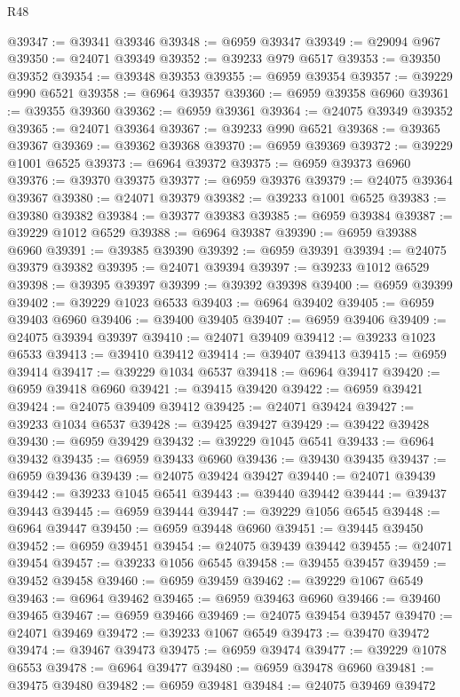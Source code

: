 \begin{lexlean}{R48}
\begin{coremodule}
@39347 := @39341 @39346
@39348 := @6959 @39347
@39349 := @29094 @967
@39350 := @24071 @39349
@39352 := @39233 @979 @6517
@39353 := @39350 @39352
@39354 := @39348 @39353
@39355 := @6959 @39354
@39357 := @39229 @990 @6521
@39358 := @6964 @39357
@39360 := @6959 @39358 @6960
@39361 := @39355 @39360
@39362 := @6959 @39361
@39364 := @24075 @39349 @39352
@39365 := @24071 @39364
@39367 := @39233 @990 @6521
@39368 := @39365 @39367
@39369 := @39362 @39368
@39370 := @6959 @39369
@39372 := @39229 @1001 @6525
@39373 := @6964 @39372
@39375 := @6959 @39373 @6960
@39376 := @39370 @39375
@39377 := @6959 @39376
@39379 := @24075 @39364 @39367
@39380 := @24071 @39379
@39382 := @39233 @1001 @6525
@39383 := @39380 @39382
@39384 := @39377 @39383
@39385 := @6959 @39384
@39387 := @39229 @1012 @6529
@39388 := @6964 @39387
@39390 := @6959 @39388 @6960
@39391 := @39385 @39390
@39392 := @6959 @39391
@39394 := @24075 @39379 @39382
@39395 := @24071 @39394
@39397 := @39233 @1012 @6529
@39398 := @39395 @39397
@39399 := @39392 @39398
@39400 := @6959 @39399
@39402 := @39229 @1023 @6533
@39403 := @6964 @39402
@39405 := @6959 @39403 @6960
@39406 := @39400 @39405
@39407 := @6959 @39406
@39409 := @24075 @39394 @39397
@39410 := @24071 @39409
@39412 := @39233 @1023 @6533
@39413 := @39410 @39412
@39414 := @39407 @39413
@39415 := @6959 @39414
@39417 := @39229 @1034 @6537
@39418 := @6964 @39417
@39420 := @6959 @39418 @6960
@39421 := @39415 @39420
@39422 := @6959 @39421
@39424 := @24075 @39409 @39412
@39425 := @24071 @39424
@39427 := @39233 @1034 @6537
@39428 := @39425 @39427
@39429 := @39422 @39428
@39430 := @6959 @39429
@39432 := @39229 @1045 @6541
@39433 := @6964 @39432
@39435 := @6959 @39433 @6960
@39436 := @39430 @39435
@39437 := @6959 @39436
@39439 := @24075 @39424 @39427
@39440 := @24071 @39439
@39442 := @39233 @1045 @6541
@39443 := @39440 @39442
@39444 := @39437 @39443
@39445 := @6959 @39444
@39447 := @39229 @1056 @6545
@39448 := @6964 @39447
@39450 := @6959 @39448 @6960
@39451 := @39445 @39450
@39452 := @6959 @39451
@39454 := @24075 @39439 @39442
@39455 := @24071 @39454
@39457 := @39233 @1056 @6545
@39458 := @39455 @39457
@39459 := @39452 @39458
@39460 := @6959 @39459
@39462 := @39229 @1067 @6549
@39463 := @6964 @39462
@39465 := @6959 @39463 @6960
@39466 := @39460 @39465
@39467 := @6959 @39466
@39469 := @24075 @39454 @39457
@39470 := @24071 @39469
@39472 := @39233 @1067 @6549
@39473 := @39470 @39472
@39474 := @39467 @39473
@39475 := @6959 @39474
@39477 := @39229 @1078 @6553
@39478 := @6964 @39477
@39480 := @6959 @39478 @6960
@39481 := @39475 @39480
@39482 := @6959 @39481
@39484 := @24075 @39469 @39472

\end{coremodule}
\end{lexlean}
